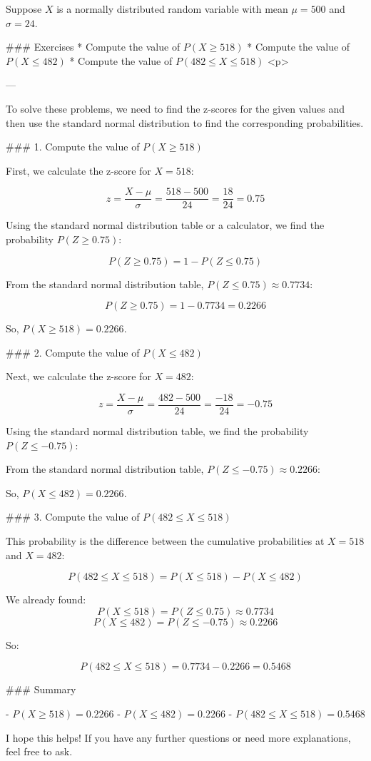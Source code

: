 
Suppose $X$ is a normally distributed random variable with mean $\mu =500$ and $\sigma = 24$.

### Exercises 
*  Compute the value of $P(X \geq 518)$
*  Compute the value of $P(X \leq 482)$
*  Compute the value of $P(482 \leq X \leq 518)$
<p>

---

To solve these problems, we need to find the z-scores for the given values and then use the standard normal distribution to find the corresponding probabilities.

### 1. Compute the value of \( P(X \geq 518) \)

First, we calculate the z-score for \( X = 518 \):

\[ z = \frac{X - \mu}{\sigma} = \frac{518 - 500}{24} = \frac{18}{24} = 0.75 \]

Using the standard normal distribution table or a calculator, we find the probability \( P(Z \geq 0.75) \):

\[ P(Z \geq 0.75) = 1 - P(Z \leq 0.75) \]

From the standard normal distribution table, \( P(Z \leq 0.75) \approx 0.7734 \):

\[ P(Z \geq 0.75) = 1 - 0.7734 = 0.2266 \]

So, \( P(X \geq 518) = 0.2266 \).

### 2. Compute the value of \( P(X \leq 482) \)

Next, we calculate the z-score for \( X = 482 \):

\[ z = \frac{X - \mu}{\sigma} = \frac{482 - 500}{24} = \frac{-18}{24} = -0.75 \]

Using the standard normal distribution table, we find the probability \( P(Z \leq -0.75) \):

From the standard normal distribution table, \( P(Z \leq -0.75) \approx 0.2266 \):

So, \( P(X \leq 482) = 0.2266 \).

### 3. Compute the value of \( P(482 \leq X \leq 518) \)

This probability is the difference between the cumulative probabilities at \( X = 518 \) and \( X = 482 \):

\[ P(482 \leq X \leq 518) = P(X \leq 518) - P(X \leq 482) \]

We already found:
\[ P(X \leq 518) = P(Z \leq 0.75) \approx 0.7734 \]
\[ P(X \leq 482) = P(Z \leq -0.75) \approx 0.2266 \]

So:

\[ P(482 \leq X \leq 518) = 0.7734 - 0.2266 = 0.5468 \]

### Summary

- \( P(X \geq 518) = 0.2266 \)
- \( P(X \leq 482) = 0.2266 \)
- \( P(482 \leq X \leq 518) = 0.5468 \)

I hope this helps! If you have any further questions or need more explanations, feel free to ask.
